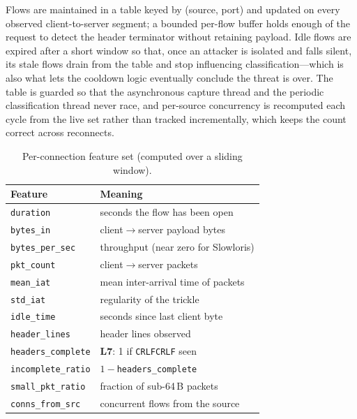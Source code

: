 \documentclass[conference]{IEEEtran}
\begin{document}
Flows are maintained in a table keyed by (source, port) and updated on every
observed client-to-server segment; a bounded per-flow buffer holds enough of the
request to detect the header terminator without retaining payload. Idle flows are
expired after a short window so that, once an attacker is isolated and falls silent,
its stale flows drain from the table and stop influencing classification---which is
also what lets the cooldown logic eventually conclude the threat is over. The table
is guarded so that the asynchronous capture thread and the periodic classification
thread never race, and per-source concurrency is recomputed each cycle from the live
set rather than tracked incrementally, which keeps the count correct across
reconnects.

\begin{table}[t]
\caption{Per-connection feature set (computed over a sliding window).}
\label{tab:features}
\centering
\footnotesize
\begin{tabular}{@{}>{\raggedright}p{}p{}@{}}
\toprule
Feature & Meaning \\
\midrule
\texttt{duration}        & seconds the flow has been open \\
\texttt{bytes\_in}       & client$\rightarrow$server payload bytes \\
\texttt{bytes\_per\_sec} & throughput (near zero for Slowloris) \\
\texttt{pkt\_count}      & client$\rightarrow$server packets \\
\texttt{mean\_iat}       & mean inter-arrival time of packets \\
\texttt{std\_iat}        & regularity of the trickle \\
\texttt{idle\_time}      & seconds since last client byte \\
\texttt{header\_lines}   & header lines observed \\
\texttt{headers\_complete} & \textbf{L7}: 1 if \texttt{CRLFCRLF} seen \\
\texttt{incomplete\_ratio} & $1-$\texttt{headers\_complete} \\
\texttt{small\_pkt\_ratio} & fraction of sub-64\,B packets \\
\texttt{conns\_from\_src}  & concurrent flows from the source \\
\bottomrule
\end{tabular}
\end{table}
\end{document}
